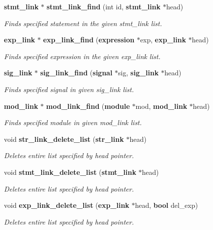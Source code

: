 \begin{CompactItemize}
{\bf stmt\_\-link} $\ast$ {\bf stmt\_\-link\_\-find} (int id, {\bf stmt\_\-link} $\ast$head)
\begin{CompactList}\small\item\em Finds specified statement in the given stmt\_\-link list.\item\end{CompactList}\item 
{\bf exp\_\-link} $\ast$ {\bf exp\_\-link\_\-find} ({\bf expression} $\ast$exp, {\bf exp\_\-link} $\ast$head)
\begin{CompactList}\small\item\em Finds specified expression in the given exp\_\-link list.\item\end{CompactList}\item 
{\bf sig\_\-link} $\ast$ {\bf sig\_\-link\_\-find} ({\bf signal} $\ast$sig, {\bf sig\_\-link} $\ast$head)
\begin{CompactList}\small\item\em Finds specified signal in given sig\_\-link list.\item\end{CompactList}\item 
{\bf mod\_\-link} $\ast$ {\bf mod\_\-link\_\-find} ({\bf module} $\ast$mod, {\bf mod\_\-link} $\ast$head)
\begin{CompactList}\small\item\em Finds specified module in given mod\_\-link list.\item\end{CompactList}\item 
void {\bf str\_\-link\_\-delete\_\-list} ({\bf str\_\-link} $\ast$head)
\begin{CompactList}\small\item\em Deletes entire list specified by head pointer.\item\end{CompactList}\item 
void {\bf stmt\_\-link\_\-delete\_\-list} ({\bf stmt\_\-link} $\ast$head)
\begin{CompactList}\small\item\em Deletes entire list specified by head pointer.\item\end{CompactList}\item 
void {\bf exp\_\-link\_\-delete\_\-list} ({\bf exp\_\-link} $\ast$head, {\bf bool} del\_\-exp)
\begin{CompactList}\small\item\em Deletes entire list specified by head pointer.\item\end{CompactList}\item 

\end{CompactItemize}
